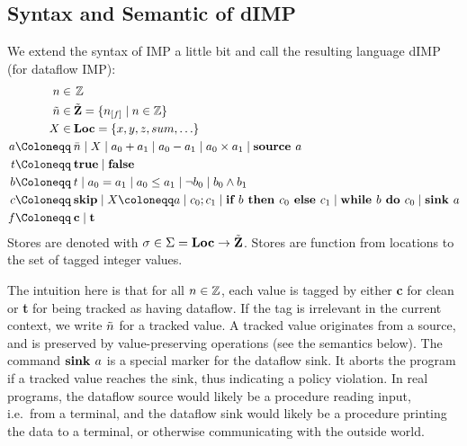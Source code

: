\subsection{Syntax and Semantic of dIMP}
We extend the syntax of IMP a little bit
and call the resulting language dIMP (for dataflow IMP):
\begin{align*}
    n \in  \:       & \Z\\
    \flaggedn{} \in \: & \StoreDomain = \{\flagged{} \mid n \in \Z\}\\
    X \in  \:       & \Loc = \{x, y, z, sum, \ldots\}\\
    a \Coloneqq \: &\literalint{} \mid X \mid a_0+a_1 \mid a_0-a_1 \mid a_0 \times a_1 \mid \defaultsource\\
    t \Coloneqq \: & \btrue \mid \bfalse                                                \\
    b \Coloneqq \: & t \mid a_0 = a_1 \mid a_0 \leq a_1 \mid \neg b_0 \mid b_0 \land b_1 \\
    c \Coloneqq \: &\skipcmd \mid \defaultstore \mid \defaultseq \mid \defaultif \mid \defaultwhile \mid \defaultsink\\
    f \Coloneqq \: & \textbf{c} \mid \textbf{t}\\
\end{align*}
Stores are denoted with $\sigma \in \Sigma = \textbf{Loc} \to \tilde{\textbf{Z}}$.
Stores are function from locations to the set of tagged integer
values.

The intuition here is that for all $n \in \operatorname{\mathbb{Z}}$, 
each value is tagged by either \textbf{c} for clean or \textbf{t} for being tracked
as having dataflow.
If the tag is irrelevant in the current context, we write $\flaggedn{}$ for a tracked
value.
A tracked value originates from a source, and is preserved by value-preserving
operations (see the semantics below).
The command $\textbf{sink }{a}$ is a special marker for the dataflow sink.
It aborts the program if a tracked value reaches the sink, thus indicating a policy 
violation.
In real programs, the dataflow source would likely be a procedure reading input,
i.e.\ from a terminal, and the dataflow sink would likely be a procedure 
printing the data to a terminal, or otherwise communicating with the outside world.


